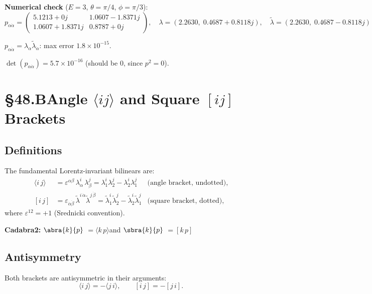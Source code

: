 \documentclass[12pt]{article}
\newcommand{\cdbexpr}[1]{\textcolor{cadblue}{$#1$}}
\newcommand{\verified}[1]{\textcolor{verifygreen}{\checkmark\; #1}}
\begin{document}
\textbf{Numerical check} ($E=3$, $\theta=\pi/4$, $\phi=\pi/3$):
\[
  p_{\alpha\dot\alpha} = \begin{pmatrix}5.1213+0j & 1.0607-1.8371j \\ 1.0607+1.8371j & 0.8787+0j\end{pmatrix},
  \quad
  \lambda = (2.2630,\;0.4687+0.8118j),
  \quad
  \tilde\lambda = (2.2630,\;0.4687-0.8118j)
\]

\verified{$p_{\alpha\dot\alpha} = \lambda_\alpha\tilde\lambda_{\dot\alpha}$: max error $1.8\times10^{-15}$.}

\verified{$\det(p_{\alpha\dot\alpha}) = 5.7\times10^{-16}$ (should be 0, since $p^2=0$).}

\section{§48.B\quad Angle $\langle ij\rangle$ and Square $[ij]$ Brackets}

\subsection{Definitions}

The fundamental Lorentz-invariant bilinears are:
\begin{align}
  \langle i\,j\rangle &= \varepsilon^{\alpha\beta}\,\lambda^i_\alpha\,\lambda^j_\beta
  = \lambda^i_1\lambda^j_2 - \lambda^i_2\lambda^j_1
  & \text{(angle bracket, undotted)},
  \tag{48.4}\\[4pt]
  [i\,j] &= \varepsilon_{\dot\alpha\dot\beta}\,\tilde\lambda^{i\,\dot\alpha}\tilde\lambda^{j\,\dot\beta}
  = \tilde\lambda^i_{\dot1}\tilde\lambda^j_{\dot2} - \tilde\lambda^i_{\dot2}\tilde\lambda^j_{\dot1}
  & \text{(square bracket, dotted)},
  \tag{48.5}
\end{align}
where $\varepsilon^{12}=+1$ (Srednicki convention).

\textbf{Cadabra2:}\quad
\cdbexpr{\abra{k}{p}} $= \langle k\,p\rangle$\quad and\quad
\cdbexpr{\sbra{k}{p}} $= [k\,p]$

\subsection{Antisymmetry}

Both brackets are antisymmetric in their arguments:
\begin{equation}
  \langle i\,j\rangle = -\langle j\,i\rangle,
  \qquad
  [i\,j] = -[j\,i].
  \tag{48.6}
\end{equation}
\end{document}
